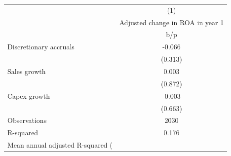 {
\def\sym#1{\ifmmode^{#1}\else\(^{#1}\)\fi}
\begin{tabular}{l*{1}{c}}
\hline\hline
                    &\multicolumn{1}{c}{(1)}\\
                    &\multicolumn{1}{c}{Adjusted change in ROA in year 1}\\
                    &         b/p   \\
\hline
Discretionary accruals&      -0.066   \\
                    &     (0.313)   \\
Sales growth        &       0.003   \\
                    &     (0.872)   \\
Capex growth        &      -0.003   \\
                    &     (0.663)   \\
\hline
Observations        &        2030   \\
R-squared           &       0.176   \\
Mean annual adjusted R-squared (%
\hline\hline
\end{tabular}
}
